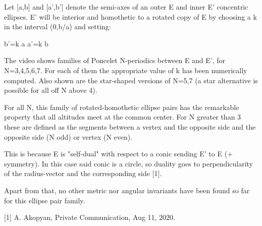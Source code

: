 Let [a,b] and [a',b'] denote the semi-axes of an outer E and inner E' concentric ellipses. E' will be interior and homothetic to a rotated copy of E by choosing a k in the interval (0,b/a) and setting:

b'=k a
a'=k b

The video shows families of Poncelet N-periodics between  E and E', for N=3,4,5,6,7. For each of them the appropriate value of k has been numerically computed. Also shown are the star-shaped versions of N=5,7 (a star alternative is possible for all off N above 4).


For all N, this family of rotated-homothetic ellipse pairs has the remarkable property that all altitudes meet at the common center. For N greater than 3 these are defined as the segments between a vertex and the opposite side and the opposite side (N odd) or vertex (N even). 

This is because E is "self-dual" with respect to a conic sending E' to E (+ symmetry). In this case said conic is a circle, so duality goes to perpendicularity of the radius-vector and the corresponding side [1].

Apart from that, no other metric nor angular invariants have been found so far for this ellipse pair family.

[1] A. Akopyan, Private Communication, Aug 11, 2020.